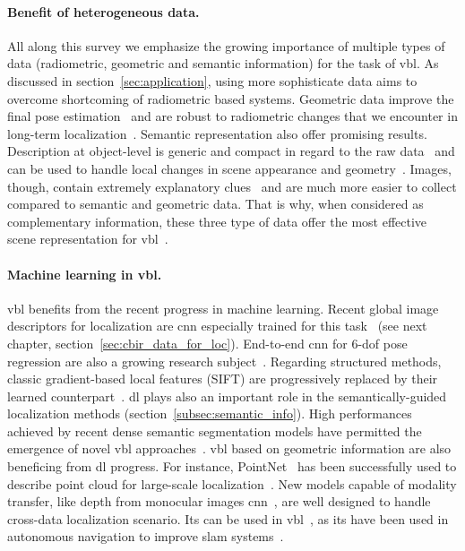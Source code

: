      	\paragraph{Benefit of heterogeneous data.}
	     	All along this survey we emphasize the growing importance of multiple types of data (radiometric, geometric and semantic information) for the task of \ac{vbl}. As discussed in section~\ref{sec:application}, using more sophisticate data aims to overcome shortcoming of radiometric based systems.
	     	Geometric data improve the final pose estimation~\citep{Pani2015Lmi,Pani2015Robust,Taira2018} and are robust to radiometric changes that we encounter in long-term localization~\citep{Uy2018}. Semantic representation also offer promising results. Description at object-level is generic and compact in regard to the raw data~\citep{Salas-Moreno2013} and can be used to handle local changes in scene appearance and geometry~\citep{Weinzaepfel2019}. Images, though, contain extremely explanatory clues~\citep{Arandjelovic2017} and are much more easier to collect compared to semantic and geometric data. That is why, when considered as complementary information, these three type of data offer the most effective scene representation for \ac{vbl}~\citep{Schonberger2017a,Taira2019}.
     
		\paragraph{Machine learning in \ac{vbl}.}
			\ac{vbl} benefits from the recent progress in machine learning. Recent global image descriptors for localization are \ac{cnn} especially trained for this task~\citep{Radenovic2017,Gordo2017,Noh2017} (see next chapter, section~\ref{sec:cbir_data_for_loc}). End-to-end \ac{cnn} for 6-\ac{dof} pose regression are also a growing research subject~\citep{Kendall2015,Kendall2016,Kendall2017,Walch2016a,Saha2018,Brahmbhatt2017a,Radwan2018}. Regarding structured methods, classic gradient-based local features (\eg SIFT) are progressively replaced by their learned counterpart~\citep{Sarlin2018a,Rocco2018}. \ac{dl} plays also an important role in the semantically-guided localization methods (section~\ref{subsec:semantic_info}). High performances achieved by recent dense semantic segmentation models have permitted the emergence of novel \ac{vbl} approaches~\citep{Toft2017,Toft2018,Naseer2017a,Shi2019,Schonberger2017a}. \ac{vbl} based on geometric information are also beneficing from \ac{dl} progress. For instance, PointNet~\citep{Qi2016a} has been successfully used to describe point cloud for large-scale localization~\citep{Uy2018}. New models capable of modality transfer, like depth from monocular images \ac{cnn}~\citep{Eigen2014}, are well designed to handle cross-data localization scenario. Its can be used in \ac{vbl}~\citep{Taira2019}, as its have been used in autonomous navigation to improve \ac{slam} systems~\citep{Tateno2017,Loo2019}.
			     
